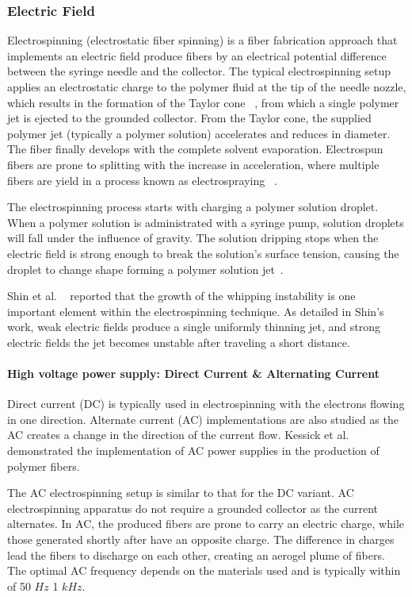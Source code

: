 \documentclass[5p,,preprint,12pt,twocolumn]{elsarticle}
\begin{document}
\subsubsection{Electric Field}Electrospinning (electrostatic fiber spinning) is a fiber fabrication approach that implements an electric field produce fibers by an electrical potential difference between the syringe needle and the collector. The typical electrospinning setup applies an electrostatic charge to the polymer fluid at the tip of the needle nozzle, which results in the formation of the Taylor cone \unskip~\cite{527120:13659828}, from which a single polymer jet is ejected to the grounded collector. From the Taylor cone, the supplied polymer jet (typically a polymer solution) accelerates and reduces in diameter. The fiber finally develops with the complete solvent evaporation. Electrospun fibers are prone to splitting with the increase in acceleration, where multiple fibers are yield in a process known as electrospraying \unskip~\cite{527120:13659925}.

The electrospinning process starts with charging a polymer solution droplet. When a polymer solution is administrated with a syringe pump, solution droplets will fall under the influence of gravity. The solution dripping stops when the electric field is strong enough to break the solution's surface tension, causing the droplet to change shape forming a polymer solution jet\unskip~\cite{527120:12033655}.

Shin et al. \unskip~\cite{527120:13659926} reported that the growth of the whipping instability is one important element within the electrospinning technique. As detailed in Shin's work, weak electric fields produce a single uniformly thinning jet, and strong electric fields the jet becomes unstable after traveling a short distance.



\paragraph{High voltage power supply: Direct Current \& Alternating Current}Direct current (DC) is typically used in electrospinning with the electrons flowing in one direction. Alternate current (AC) implementations are also studied as the AC creates a change in the direction of the current flow. Kessick et al.\unskip~\cite{527120:13444381} demonstrated the implementation of AC power supplies in the production of polymer fibers.

The AC electrospinning setup is similar to that for the DC variant. AC electrospinning apparatus do not require a grounded collector as the current alternates. In AC, the produced fibers are prone to carry an electric charge, while those generated shortly after have an opposite charge. The difference in charges lead the fibers to discharge on each other, creating an aerogel plume of fibers. The optimal AC frequency depends on the materials used and is typically within of 50 $Hz $ {\textendash} 1 $kHz $. \unskip~\cite{527120:13443405}
\end{document}
